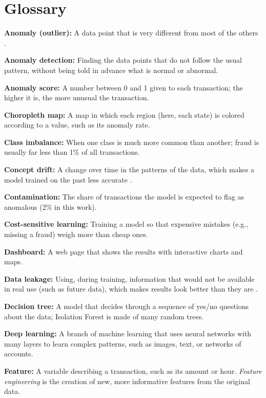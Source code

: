 \section{Glossary}
\label{sec:glossary}

\begingroup
\footnotesize
\setlength{\parindent}{0pt}
\setlength{\parskip}{3pt}

\textbf{Anomaly (outlier):} A data point that is very different from most of the others \cite{chandola2009anomaly}.

\textbf{Anomaly detection:} Finding the data points that do not follow the usual pattern, without being told in advance what is normal or abnormal.

\textbf{Anomaly score:} A number between 0 and 1 given to each transaction; the higher it is, the more unusual the transaction.

\textbf{Choropleth map:} A map in which each region (here, each state) is colored according to a value, such as its anomaly rate.

\textbf{Class imbalance:} When one class is much more common than another; fraud is usually far less than 1\% of all transactions.

\textbf{Concept drift:} A change over time in the patterns of the data, which makes a model trained on the past less accurate \cite{gama2014survey}.

\textbf{Contamination:} The share of transactions the model is expected to flag as anomalous (2\% in this work).

\textbf{Cost-sensitive learning:} Training a model so that expensive mistakes (e.g., missing a fraud) weigh more than cheap ones.

\textbf{Dashboard:} A web page that shows the results with interactive charts and maps.

\textbf{Data leakage:} Using, during training, information that would not be available in real use (such as future data), which makes results look better than they are \cite{kaufman2012leakage}.

\textbf{Decision tree:} A model that decides through a sequence of yes/no questions about the data; Isolation Forest is made of many random trees.

\textbf{Deep learning:} A branch of machine learning that uses neural networks with many layers to learn complex patterns, such as images, text, or networks of accounts.

\textbf{Feature:} A variable describing a transaction, such as its amount or hour. \textit{Feature engineering} is the creation of new, more informative features from the original data.

